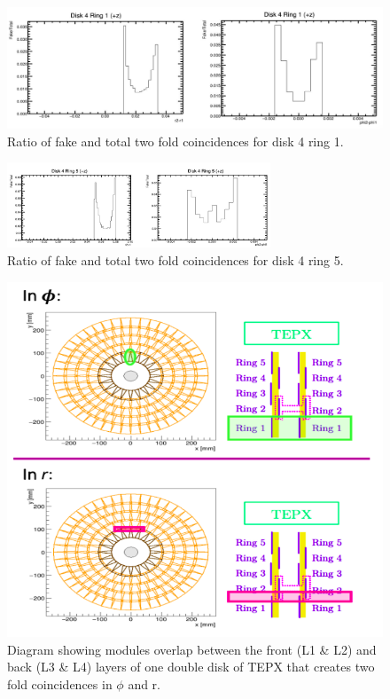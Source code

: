 \begin{figure}[!htp]
\centering
\includegraphics[width=1\textwidth]{ashish_thesis/D4R1_fake_true_ratio.png}
\caption{%
  Ratio of fake and total two fold coincidences for disk 4 ring 1.
}
\label{fig:cluster_ring}
\end{figure}


\begin{figure}[!htp]
\centering
\includegraphics[width=0.7\textwidth]{ashish_thesis/D4R5_fake_true_ratio.png}
\caption{%
  Ratio of fake and total two fold coincidences for disk 4 ring 5.
}
\label{fig:cluster_ring}
\end{figure}

\begin{figure}[H]
  \centering
  \includegraphics[width=0.7\columnwidth]{ashish_thesis/2foldinrphi.png}
  \caption{ \onehalfspacing Diagram showing modules overlap between the front (L1 \& L2) and back (L3 \& L4) layers of one double disk of TEPX that creates two fold coincidences in $\phi$ and r.}
  \label{fig:CMS}
\end{figure}


